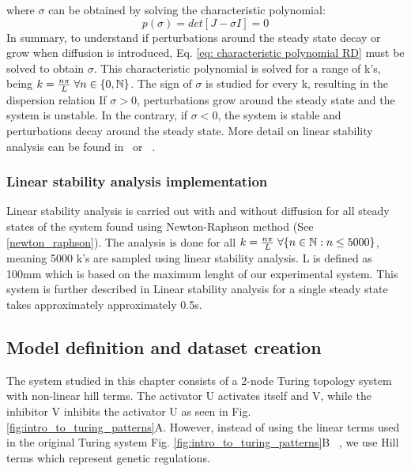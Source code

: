 where $\sigma$ can be obtained by solving the characteristic polynomial:
\begin{equation}
    p(\sigma) = det[J-\sigma I] = 0
    \label{eq: characteristic polynomial RD}
\end{equation}
In summary, to understand if perturbations around the steady state decay or grow when diffusion is introduced, Eq. \eqref{eq: characteristic polynomial RD} must be solved to obtain $\sigma$.
This characteristic polynomial is solved for a range of k's, being $k=\frac{n\pi}{L} \hspace{0.1cm}\forall n \in \{0, \mathbb{N}\} $.
The sign of $\sigma$ is studied for every k, resulting in the dispersion relation %
If $\sigma > 0$, perturbations grow around the steady state and the system is unstable.
In the contrary, if  $\sigma < 0$, the system is stable and perturbations decay around the steady state.
More detail on linear stability analysis can be found in~\cite{J.DMurray2002} or ~\cite{Glendinning1994}.
\subsubsection{Linear stability analysis implementation}
Linear stability analysis is carried out with and without diffusion for all steady states of the system found using Newton-Raphson method (See \ref{newton_raphson}).
The analysis is done for all $k=\frac{n\pi}{L} \hspace{0.1cm}\forall \{n \in \mathbb{N} : n \leq 5000\} $, meaning 5000 k's are sampled using linear stability analysis.
L is defined as 100mm which is based on the maximum lenght of our experimental system.
This system is further described in %
Linear stability analysis for a single steady state takes approximately approximately 0.5s.

\subsection{Model definition and dataset creation}
The system studied in this chapter consists of a 2-node Turing topology system with non-linear hill terms.
The activator U activates itself and V, while the inhibitor V inhibits the activator U as seen in Fig. \ref{fig:intro_to_turing_patterns}A.
However, instead of using the linear terms used in the original Turing system Fig. \ref{fig:intro_to_turing_patterns}B ~\parencite{Turing1952}, we use Hill terms which represent genetic regulations.


